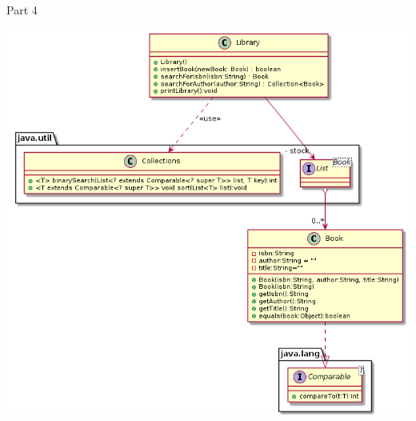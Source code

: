 \begin{frame}{Part 4}

	\begin{center}
		\includegraphics[scale=.34]{07_collection/hands_on_04.png}
	\end{center}
		

		
\end{frame}


